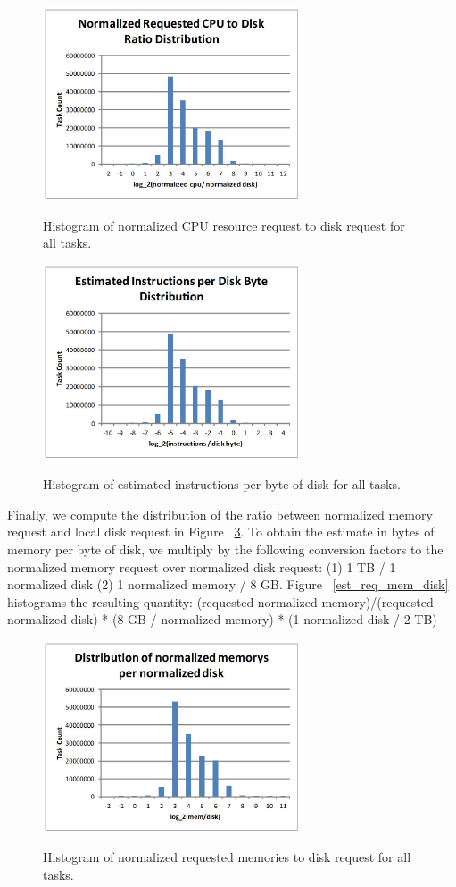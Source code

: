 \documentclass{sig-alternate}
\begin{document}
\begin{figure}
\centering
\includegraphics[width=3in]{../figures/req_cpu_disk.jpg}
\label{req_cpu_disk}
\caption{Histogram of normalized CPU resource request to disk request for all tasks.}
\end{figure}

\begin{figure}
\centering
\includegraphics[width=3in]{../figures/est_req_cpu_disk.jpg}
\label{est_req_cpu_disk}
\caption{Histogram of estimated instructions per byte of disk for all tasks.}
\end{figure}

Finally, we compute the distribution of the ratio between normalized memory request and local disk request in Figure ~\ref{req_mem_disk}.
To obtain the estimate in bytes of memory per byte of disk, we multiply by the following conversion factors to the normalized memory request over normalized disk request: (1) 1 TB / 1 normalized disk (2) 1 normalized memory / 8 GB.
Figure ~\ref{est_req_mem_disk} histograms the resulting quantity:
(requested normalized memory)/(requested normalized disk) * (8 GB / normalized memory) * (1 normalized disk / 2 TB)

\begin{figure}
\centering
\includegraphics[width=3in]{../figures/req_mem_disk.jpg}
\label{req_mem_disk}
\caption{Histogram of normalized requested memories to disk request for all tasks.}
\end{figure}
\end{document}
